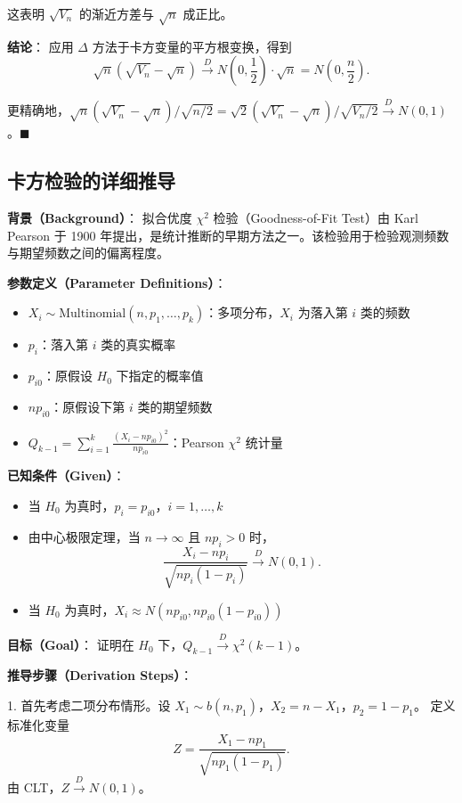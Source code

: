 这表明 $\sqrt{V_n}$ 的渐近方差与 $\sqrt{n}$ 成正比。

\textbf{结论}：
应用 $\Delta$ 方法于卡方变量的平方根变换，得到
\[
\sqrt{n}(\sqrt{V_n} - \sqrt{n}) \xrightarrow{D} N\left(0, \frac{1}{2}\right) \cdot \sqrt{n} = N\left(0, \frac{n}{2}\right).
\]

更精确地，$\sqrt{n}(\sqrt{V_n} - \sqrt{n}) / \sqrt{n/2} = \sqrt{2}(\sqrt{V_n} - \sqrt{n}) / \sqrt{V_n/2} \xrightarrow{D} N(0, 1)$。$\blacksquare$

\subsection{卡方检验的详细推导}\label{sec:chi-square-test-derivation}

\textbf{背景（Background）}：
拟合优度 $\chi^2$ 检验（Goodness-of-Fit Test）由 Karl Pearson 于 1900 年提出，是统计推断的早期方法之一。该检验用于检验观测频数与期望频数之间的偏离程度。

\textbf{参数定义（Parameter Definitions）}：
\begin{itemize}
\item $X_i \sim \text{Multinomial}(n, p_1, \ldots, p_k)$：多项分布，$X_i$ 为落入第 $i$ 类的频数
\item $p_i$：落入第 $i$ 类的真实概率
\item $p_{i0}$：原假设 $H_0$ 下指定的概率值
\item $np_{i0}$：原假设下第 $i$ 类的期望频数
\item $Q_{k-1} = \sum_{i=1}^k \frac{(X_i - np_{i0})^2}{np_{i0}}$：Pearson $\chi^2$ 统计量
\end{itemize}

\textbf{已知条件（Given）}：
\begin{itemize}
\item 当 $H_0$ 为真时，$p_i = p_{i0}$，$i = 1, \ldots, k$
\item 由中心极限定理，当 $n \to \infty$ 且 $np_i > 0$ 时，
\[
\frac{X_i - np_i}{\sqrt{np_i(1-p_i)}} \xrightarrow{D} N(0, 1).
\]
\item 当 $H_0$ 为真时，$X_i \approx N(np_{i0}, np_{i0}(1-p_{i0}))$
\end{itemize}

\textbf{目标（Goal）}：
证明在 $H_0$ 下，$Q_{k-1} \xrightarrow{D} \chi^2(k-1)$。

\textbf{推导步骤（Derivation Steps）}：

1. 首先考虑二项分布情形。设 $X_1 \sim b(n, p_1)$，$X_2 = n - X_1$，$p_2 = 1 - p_1$。
定义标准化变量
\[
Z = \frac{X_1 - np_1}{\sqrt{np_1(1-p_1)}}.
\]
由 CLT，$Z \xrightarrow{D} N(0, 1)$。

